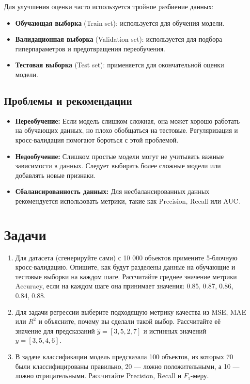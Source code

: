 Для улучшения оценки часто используется тройное разбиение данных:
\begin{itemize}
    \item \textbf{Обучающая выборка} (Train set): используется для обучения модели.
    \item \textbf{Валидационная выборка} (Validation set): используется для подбора гиперпараметров и предотвращения переобучения.
    \item \textbf{Тестовая выборка} (Test set): применяется для окончательной оценки модели.
\end{itemize}

\subsection*{Проблемы и рекомендации}
\begin{itemize}
    \item \textbf{Переобучение:} Если модель слишком сложная, она может хорошо работать на обучающих данных, но плохо обобщаться на тестовые. Регуляризация и кросс-валидация помогают бороться с этой проблемой.
    \item \textbf{Недообучение:} Слишком простые модели могут не учитывать важные зависимости в данных. Следует выбирать более сложные модели или добавлять новые признаки.
    \item \textbf{Сбалансированность данных:} Для несбалансированных данных рекомендуется использовать метрики, такие как Precision, Recall или AUC.
\end{itemize}

\section*{Задачи}

\begin{enumerate}
    \item Для датасета (сгенерируйте сами) с 10 000 объектов примените 5-блочную кросс-валидацию. Опишите, как будут разделены данные на обучающие и тестовые выборки на каждом шаге. Рассчитайте среднее значение метрики Accuracy, если на каждом шаге она принимает значения: 0.85, 0.87, 0.86, 0.84, 0.88.

    \item Для задачи регрессии выберите подходящую метрику качества из MSE, MAE или $R^2$ и объясните, почему вы сделали такой выбор. Рассчитайте её значение для предсказаний $\hat{y} = [3, 5, 2, 7]$ и истинных значений $y = [3, 5, 4, 6]$.

    \item В задаче классификации модель предсказала 100 объектов, из которых 70 были классифицированы правильно, 20 --- ложно положительными, а 10 --- ложно отрицательными. Рассчитайте Precision, Recall и $F_1$-меру.
\end{enumerate}

